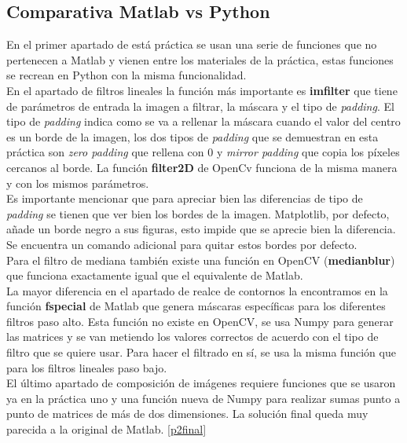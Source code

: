 \documentclass[a4paper,12pt]{report}
\begin{document}
\subsection{Comparativa Matlab vs Python}

En el primer apartado de está práctica se usan una serie de funciones que no pertenecen a Matlab y vienen entre los materiales de la práctica, estas funciones se recrean en Python con la misma funcionalidad.\\

En el apartado de filtros lineales la función más importante es \textbf{imfilter} que tiene de parámetros de entrada la imagen a filtrar, la máscara y el tipo de \emph{padding}. El tipo de \emph{padding} indica como se va a rellenar la máscara cuando el valor del centro es un borde de la imagen, los dos tipos de \emph{padding} que se demuestran en esta práctica son \emph{zero padding} que rellena con 0 y \emph{mirror padding} que copia los píxeles cercanos al borde. La función \textbf{filter2D} de OpenCv funciona de la misma manera y con los mismos parámetros.\\

Es importante mencionar que para apreciar bien las diferencias de tipo de \emph{padding} se tienen que ver bien los bordes de la imagen. Matplotlib, por defecto, añade un borde negro a sus figuras, esto impide que se aprecie bien la diferencia. Se encuentra un comando adicional para quitar estos bordes por defecto.\\

Para el filtro de mediana también existe una función en OpenCV (\textbf{medianblur}) que funciona exactamente igual que el equivalente de Matlab.\\

La mayor diferencia en el apartado de realce de contornos la encontramos en la función \textbf{fspecial} de Matlab que genera máscaras específicas para los diferentes filtros paso alto. Esta función no existe en OpenCV, se usa Numpy para generar las matrices y se van metiendo los valores correctos de acuerdo con el tipo de filtro que se quiere usar. Para hacer el filtrado en sí, se usa la misma función que para los filtros lineales paso bajo.\\

El último apartado de composición de imágenes requiere funciones que se usaron ya en la práctica uno y una función nueva de Numpy para realizar sumas punto a punto de matrices de más de dos dimensiones. La solución final queda muy parecida a la original de Matlab.
\ref {p2final}\\
\end{document}
